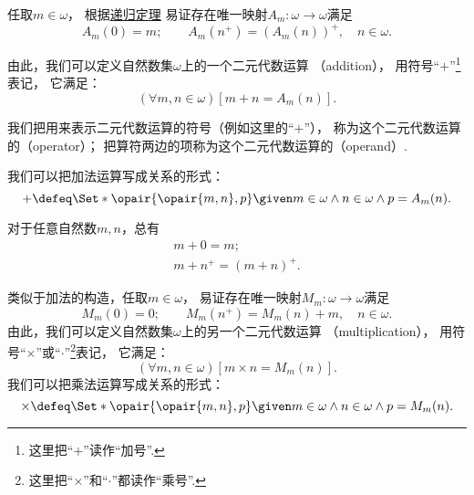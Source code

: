 任取\(m \in \omega\)，
根据\hyperref[theorem:集合论.自然数集的递归定理]{递归定理}%
易证存在唯一映射\(A_m\colon \omega \to \omega\)满足\begin{equation*}
	A_m(0) = m; \qquad
	A_m(n^+) = (A_m(n))^+, \quad n \in \omega.
\end{equation*}

由此，我们可以定义自然数集\(\omega\)上的一个二元代数运算%
（addition），
用符号“\(+\)”\footnote{%
这里把“\(+\)”读作“加号”.
}表记，
它满足：\begin{equation*}
	(\forall m,n\in\omega)
	[m + n = A_m(n)].
\end{equation*}

我们把用来表示二元代数运算的符号（例如这里的“\(+\)”），
称为这个二元代数运算的（operator）；
把算符两边的项称为这个二元代数运算的（operand）.

我们可以把加法运算写成关系的形式：\begin{equation*}
	+ \defeq \Set*{
		\opair{\opair{m,n},p}
		\given
		m \in \omega
		\land
		n \in \omega
		\land
		p = A_m(n)
	}.
\end{equation*}

\begin{theorem}
对于任意自然数\(m,n\)，总有\begin{gather}
	m + 0 = m;
	\label{equation:集合论.自然数的加法.性质1} \\%
	m + n^+ = (m+n)^+.
	\label{equation:集合论.自然数的加法.性质2}%
\end{gather}
\end{theorem}

类似于加法的构造，任取\(m \in \omega\)，
易证存在唯一映射\(M_m\colon \omega \to \omega\)满足\begin{equation*}
	M_m(0) = 0; \qquad
	M_m(n^+) = M_m(n) + m, \quad n \in \omega.
\end{equation*}
由此，我们可以定义自然数集\(\omega\)上的另一个二元代数运算%
（multiplication），
用符号“\(\times\)”或“\(\cdot\)”\footnote{%
这里把“\(\times\)”和“\(\cdot\)”都读作“乘号”.
}表记，
它满足：\begin{equation*}
	(\forall m,n\in\omega)[m \times n = M_m(n)].
\end{equation*}
我们可以把乘法运算写成关系的形式：\begin{equation*}
	\times \defeq \Set*{
		\opair{\opair{m,n},p}
		\given
		m \in \omega
		\land
		n \in \omega
		\land
		p = M_m(n)
	}.
\end{equation*}

